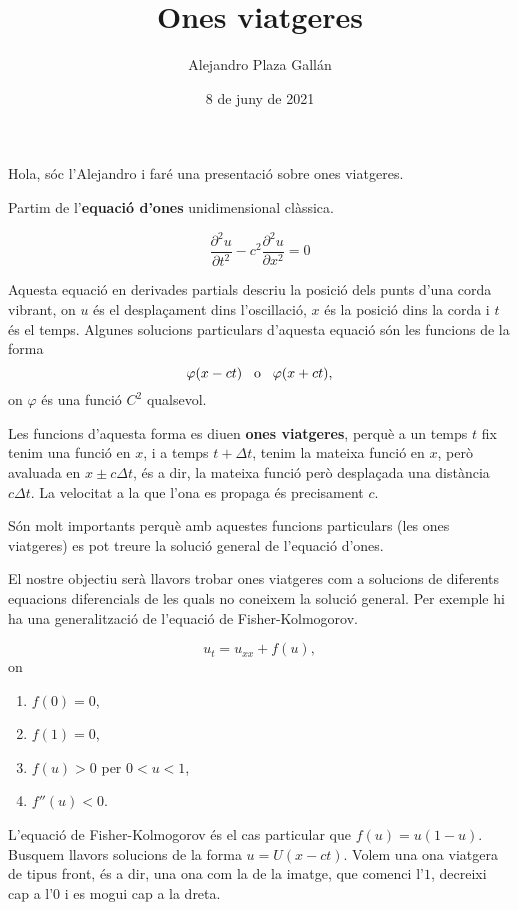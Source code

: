 \documentclass{article}
\title{Ones viatgeres}
\author{Alejandro Plaza Gall\'{a}n}
\date{8 de juny de 2021}
\theoremstyle{definition}
\begin{document}
\maketitle
Hola, s\'{o}c l'Alejandro i far\'{e} una presentaci\'{o} sobre ones viatgeres.

Partim de l'\textbf{equaci\'{o} d'ones} unidimensional cl\`{a}ssica.

\[\frac{\partial^2u}{\partial t^2}-c^2\frac{\partial^2u}{\partial x^2}=0\]

Aquesta equaci\'{o} en derivades partials descriu la posici\'{o} dels punts d'una corda vibrant, on $u$ \'{e}s el despla\c{c}ament dins l'oscil\textperiodcentered laci\'{o}, $x$ \'{e}s la posici\'{o} dins la corda i $t$ \'{e}s el temps. Algunes solucions particulars d'aquesta equaci\'{o} s\'{o}n les funcions de la forma
\[\varphi(x-ct)\hspace{3mm}\text{o}\hspace{3mm}\varphi(x+ct),\]
on $\varphi$ \'{e}s una funci\'{o} $C^2$ qualsevol.

Les funcions d'aquesta forma es diuen \textbf{ones viatgeres}, perqu\`{e} a un temps $t$ fix tenim una funci\'{o} en $x$, i a temps $t+\Delta t$, tenim la mateixa funci\'{o} en $x$, per\`{o} avaluada en $x\pm c\Delta t$, \'{e}s a dir, la mateixa funci\'{o} per\`{o} despla\c{c}ada una dist\`{a}ncia $c\Delta t$. La velocitat a la que l'ona es propaga \'{e}s precisament $c$.

S\'{o}n molt importants perqu\`{e} amb aquestes funcions particulars (les ones viatgeres) es pot treure la soluci\'{o} general de l'equaci\'{o} d'ones.

El nostre objectiu ser\`{a} llavors trobar ones viatgeres com a solucions de diferents equacions diferencials de les quals no coneixem la soluci\'{o} general. Per exemple hi ha una generalitzaci\'{o} de l'equaci\'{o} de Fisher-Kolmogorov.

\[u_t=u_{xx}+f(u),\]
on
\begin{enumerate}
\item $f(0)=0$,
\item $f(1)=0$,
\item $f(u)>0$ per $0<u<1$,
\item $f''(u)<0$.
\end{enumerate}

L'equaci\'{o} de Fisher-Kolmogorov \'{e}s el cas particular que $f(u)=u(1-u)$. Busquem llavors solucions de la forma $u=U(x-ct)$. Volem una ona viatgera de tipus front, \'{e}s a dir, una ona com la de la imatge, que comenci l'$1$, decreixi cap a l'$0$ i es mogui cap a la dreta.
\end{document}

